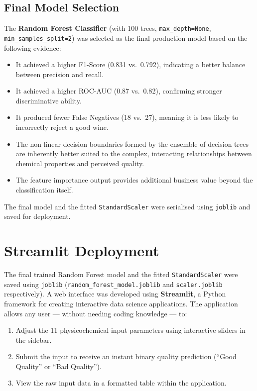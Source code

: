 \documentclass[11pt,a4paper]{article}
\begin{document}
\subsection{Final Model Selection}

The \textbf{Random Forest Classifier} (with 100 trees, \texttt{max\_depth=None}, \texttt{min\_samples\_split=2}) was selected as the final production model based on the following evidence:

\begin{itemize}
    \item It achieved a higher F1-Score (0.831 vs.\ 0.792), indicating a better balance between precision and recall.
    \item It achieved a higher ROC-AUC (0.87 vs.\ 0.82), confirming stronger discriminative ability.
    \item It produced fewer False Negatives (18 vs.\ 27), meaning it is less likely to incorrectly reject a good wine.
    \item The non-linear decision boundaries formed by the ensemble of decision trees are inherently better suited to the complex, interacting relationships between chemical properties and perceived quality.
    \item The feature importance output provides additional business value beyond the classification itself.
\end{itemize}

The final model and the fitted \texttt{StandardScaler} were serialised using \texttt{joblib} and saved for deployment.

\section{Streamlit Deployment}

The final trained Random Forest model and the fitted \texttt{StandardScaler} were saved using \texttt{joblib} (\texttt{random\_forest\_model.joblib} and \texttt{scaler.joblib} respectively). A web interface was developed using \textbf{Streamlit}, a Python framework for creating interactive data science applications. The application allows any user --- without needing coding knowledge --- to:

\begin{enumerate}
    \item Adjust the 11 physicochemical input parameters using interactive sliders in the sidebar.
    \item Submit the input to receive an instant binary quality prediction (``Good Quality'' or ``Bad Quality'').
    \item View the raw input data in a formatted table within the application.
\end{enumerate}
\end{document}
